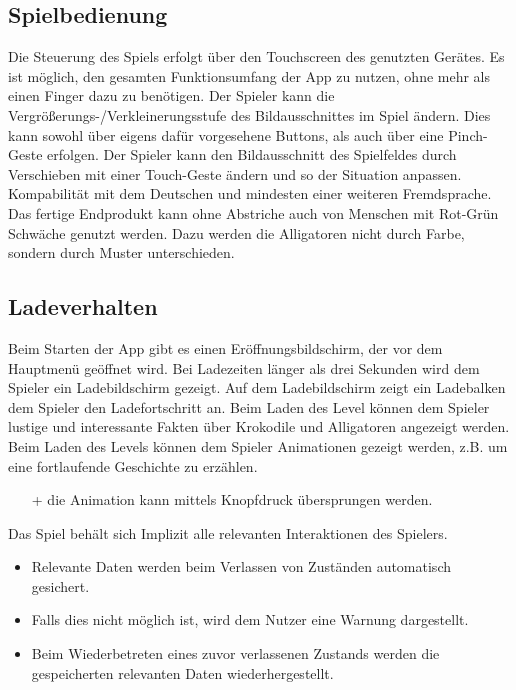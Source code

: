 \subsection {Spielbedienung}
\begin {requirements}
	 Die Steuerung des Spiels erfolgt über den Touchscreen des genutzten Gerätes.
	 Es ist möglich, den gesamten Funktionsumfang der App zu nutzen, ohne mehr als einen Finger dazu zu benötigen.
	 Der Spieler kann die Vergrößerungs-/Verkleinerungsstufe des Bildausschnittes im Spiel ändern.
	Dies kann sowohl über eigens dafür vorgesehene Buttons, als auch über eine Pinch-Geste erfolgen.
	Der Spieler kann den Bildausschnitt des Spielfeldes durch Verschieben mit einer Touch-Geste ändern und so der Situation anpassen.
	Kompabilität mit dem Deutschen und mindesten einer weiteren Fremdsprache.
	Das fertige Endprodukt kann ohne Abstriche auch von Menschen mit Rot-Grün Schwäche genutzt werden. Dazu werden die Alligatoren nicht durch Farbe, sondern durch Muster unterschieden.
\end {requirements}

\subsection{Ladeverhalten}
\begin {requirements}
	 Beim Starten der App gibt es einen Eröffnungsbildschirm, der vor dem Hauptmenü geöffnet wird.
	 Bei Ladezeiten länger als drei Sekunden wird dem Spieler ein Ladebildschirm gezeigt.
	 Auf dem Ladebildschirm zeigt ein Ladebalken dem Spieler den Ladefortschritt an.
	 Beim Laden des Level können dem Spieler lustige und interessante Fakten über Krokodile und Alligatoren angezeigt werden.
	 Beim Laden des Levels können dem Spieler Animationen gezeigt werden, z.B. um eine fortlaufende Geschichte zu erzählen.
	\begin{itemize}
		\item[+] die Animation kann mittels Knopfdruck übersprungen werden.
	\end{itemize}
	 Das Spiel behält sich Implizit alle relevanten Interaktionen des Spielers.
	\begin{itemize}
		\item Relevante Daten werden beim Verlassen von Zuständen automatisch gesichert.
		\item Falls dies nicht möglich ist, wird dem Nutzer eine Warnung dargestellt.
		\item Beim Wiederbetreten eines zuvor verlassenen Zustands werden die gespeicherten relevanten Daten wiederhergestellt.
	\end{itemize}
\end {requirements}

